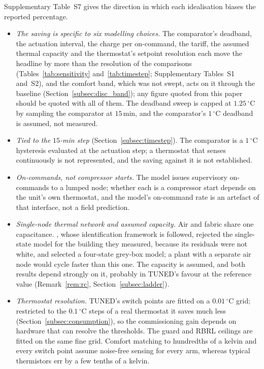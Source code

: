 \documentclass[pdflatex,sn-mathphys-num,iicol]{sn-jnl}
\theoremstyle{thmstyleone}\newtheorem{proposition}{Proposition}\newtheorem{corollary}{Corollary}
\theoremstyle{thmstyletwo}\newtheorem{remark}{Remark}\newtheorem{observation}{Observation}
\theoremstyle{thmstylethree}\newtheorem{definition}{Definition}
\begin{document}
Supplementary Table~S7 gives the direction in which each idealisation biases the reported percentage.
\begin{itemize}[leftmargin=*,itemsep=1pt,topsep=2pt]
\item \emph{The saving is specific to six modelling choices.} The comparator's
deadband, the actuation interval, the charge per on-command, the tariff, the assumed thermal capacity and the thermostat's setpoint resolution each move the headline by more than the resolution of the comparisons (Tables~\ref{tab:sensitivity} and~\ref{tab:timestep}; Supplementary Tables~S1 and~S2), and the comfort band, which was not swept, acts on it through the baseline (Section~\ref{subsec:disc_band}); any figure quoted from this paper should be quoted with all of them. The deadband sweep is capped at $1.25\,^\circ$C by sampling the comparator at $15\,$min, and the comparator's $1\,^\circ$C deadband is assumed, not measured.
\item \emph{Tied to the $15$-min step} (Section~\ref{subsec:timestep}).
The comparator is a $1\,^\circ$C hysteresis evaluated at the actuation step; a thermostat that senses continuously is not represented, and the saving against it is not established.
\item \emph{On-commands, not compressor starts.} The model issues supervisory
on-commands to a lumped node; whether each is a compressor start depends on the unit's own thermostat, and the model's on-command rate is an artefact of that interface, not a field prediction.
\item \emph{Single-node thermal network and assumed capacity.} Air and fabric
share one capacitance. \citet{Bacher2011}, whose identification framework is followed, rejected the single-state model for the building they measured, because its residuals were not white, and selected a four-state grey-box model; a plant with a separate air node would cycle faster than this one. The capacity is assumed, and both results depend strongly on it, probably in TUNED's favour at the reference value (Remark~\ref{rem:rc}, Section~\ref{subsec:ladder}).
\item \emph{Thermostat resolution.} TUNED's switch points are fitted on a
$0.01\,^\circ$C grid; restricted to the $0.1\,^\circ$C steps of a real thermostat it saves much less (Section~\ref{subsec:consumption}), so the commissioning gain depends on hardware that can resolve the thresholds. The guard and RBRL ceilings are fitted on the same fine grid. Comfort matching to hundredths of a kelvin and every switch point assume noise-free sensing for every arm, whereas typical thermistors err by a few tenths of a kelvin.

\end{itemize}
\end{document}
